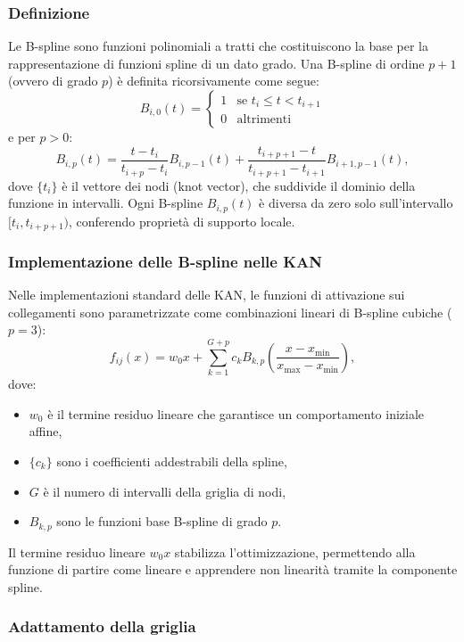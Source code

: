 \documentclass[a4paper,12pt]{report}
\begin{document}
	\subsubsection{Definizione}
	Le B-spline sono funzioni polinomiali a tratti che costituiscono la base per la rappresentazione di funzioni spline di un dato grado. Una B-spline di ordine \(p+1\) (ovvero di grado \(p\)) è definita ricorsivamente come segue:
	\[
	B_{i,0}(t) = \begin{cases}
		1 & \text{se } t_i \leq t < t_{i+1} \\
		0 & \text{altrimenti}
	\end{cases}
	\]
	e per \(p > 0\):
	\[
	B_{i,p}(t) = \frac{t - t_i}{t_{i+p} - t_i} B_{i,p-1}(t) + \frac{t_{i+p+1} - t}{t_{i+p+1} - t_{i+1}} B_{i+1,p-1}(t),
	\]
	dove \(\{t_i\}\) è il vettore dei nodi (knot vector), che suddivide il dominio della funzione in intervalli. Ogni B-spline \(B_{i,p}(t)\) è diversa da zero solo sull'intervallo \([t_i, t_{i+p+1})\), conferendo proprietà di supporto locale.
	
	\subsubsection{Implementazione delle B-spline nelle KAN}
	
	Nelle implementazioni standard delle KAN, le funzioni di attivazione sui collegamenti sono parametrizzate come combinazioni lineari di B-spline cubiche (\(p=3\)):
	\[
	f_{ij}(x) = w_0 x + \sum_{k=1}^{G+p} c_k B_{k,p}\left(\frac{x - x_{\min}}{x_{\max} - x_{\min}}\right),
	\]
	dove:
	\begin{itemize}
		\item \(w_0\) è il termine residuo lineare che garantisce un comportamento iniziale affine,
		\item \(\{c_k\}\) sono i coefficienti addestrabili della spline,
		\item \(G\) è il numero di intervalli della griglia di nodi,
		\item \(B_{k,p}\) sono le funzioni base B-spline di grado \(p\).
	\end{itemize}
	Il termine residuo lineare \(w_0 x\) stabilizza l’ottimizzazione, permettendo alla funzione di partire come lineare e apprendere non linearità tramite la componente spline.
	
	\subsubsection{Adattamento della griglia}
	
\end{document}
